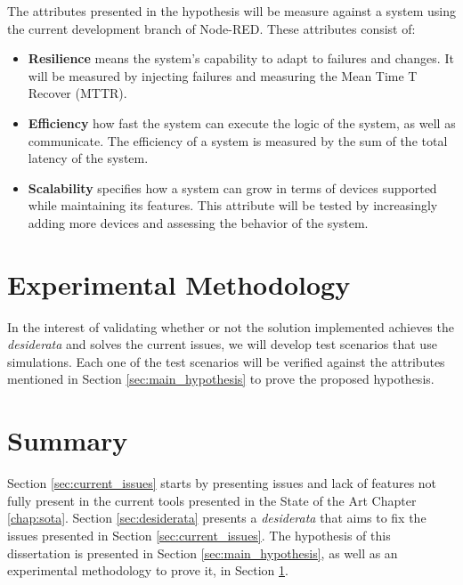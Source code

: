 The attributes presented in the hypothesis will be measure against a system using the current development branch of Node-RED. These attributes consist of:

\begin{itemize}
    \item \textbf{Resilience} means the system's capability to adapt to failures and changes. It will be measured by injecting failures and measuring the Mean Time T Recover (MTTR).
    \item \textbf{Efficiency} how fast the system can execute the logic of the system, as well as communicate. The efficiency of a system is measured by the sum of the total latency of the system. 
    \item \textbf{Scalability} specifies how a system can grow in terms of devices supported while maintaining its features. This attribute will be tested by increasingly adding more devices and assessing the behavior of the system.
\end{itemize}

\section{Experimental Methodology}\label{sec:exp_meth}

In the interest of validating whether or not the solution implemented achieves the \emph{desiderata} and solves the current issues, we will develop test scenarios that use simulations. Each one of the test scenarios will be verified against the attributes mentioned in Section \ref{sec:main_hypothesis} to prove the proposed hypothesis.


\section{Summary}\label{sec:stat_summary}

Section \ref{sec:current_issues} starts by presenting issues and lack of features not fully present in the current tools presented in the State of the Art Chapter \ref{chap:sota}. Section \ref{sec:desiderata} presents a \textit{desiderata} that aims to fix the issues presented in Section \ref{sec:current_issues}. The hypothesis of this dissertation is presented in Section \ref{sec:main_hypothesis}, as well as an experimental methodology to prove it, in Section \ref{sec:exp_meth}.
